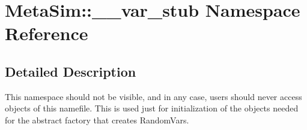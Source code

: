 \hypertarget{namespaceMetaSim_1_1____var__stub}{}\section{Meta\+Sim\+:\+:\+\_\+\+\_\+var\+\_\+stub Namespace Reference}
\label{namespaceMetaSim_1_1____var__stub}


\subsection{Detailed Description}
This namespace should not be visible, and in any case, users should never access objects of this namefile. This is used just for initialization of the objects needed for the abstract factory that creates Random\+Vars. 
